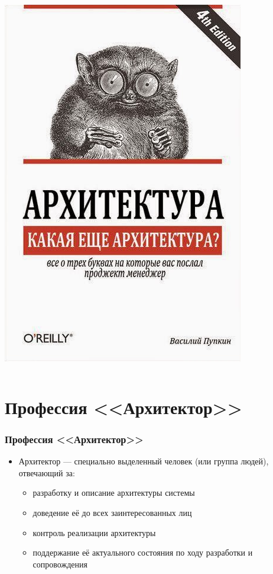 \documentclass[xetex,mathserif,serif]{beamer}
\begin{document}
\begin{frame}
\begin{columns}
\begin{column}{0.3\textwidth}
				\includegraphics[width=\textwidth]{whatArchitecture.png}
			\end{column}
		\end{columns}
	\end{frame}

	\section{Профессия <<Архитектор>>}

	\begin{frame}
		\frametitle{Профессия <<Архитектор>>}
		\begin{itemize}
			\item Архитектор --- специально выделенный человек (или группа людей), отвечающий за:
			\begin{itemize}
				\item разработку и описание архитектуры системы
				\item доведение её до всех заинтересованных лиц
				\item контроль реализации архитектуры
				\item поддержание её актуального состояния по ходу разработки и сопровождения
			\end{itemize}
		\end{itemize}
	\end{frame}
\end{document}
